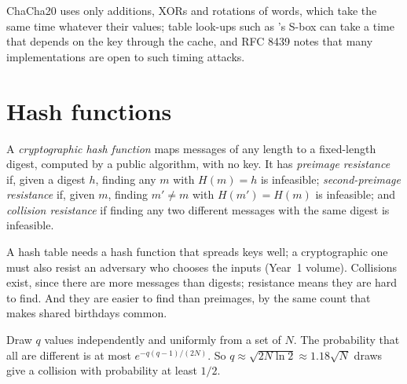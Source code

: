 \label{lst:b3:symmetric-cryptography:chacha}

\label{out:b3:symmetric-cryptography:chacha}

ChaCha20 uses only additions, XORs and rotations of words, which take the same time whatever their values; table look-ups such as 's S-box can take a time that depends on the key through the cache, and RFC 8439 notes that many  implementations are open to such timing attacks. %

\section{Hash functions}\label{sec:b3:symmetric-cryptography:hash}

\begin{definition}\label{def:b3:symmetric-cryptography:hash}
A \emph{cryptographic hash function} maps messages of any length to a fixed-length digest, computed by a public algorithm, with no key. It has \emph{preimage resistance} if, given a digest $h$, finding any $m$ with $H(m) = h$ is infeasible; \emph{second-preimage resistance} if, given $m$, finding $m' \ne m$ with $H(m') = H(m)$ is infeasible; and \emph{collision resistance} if finding any two different messages with the same digest is infeasible.
\end{definition}

A hash table needs a hash function that spreads keys well; a cryptographic one must also resist an adversary who chooses the inputs (Year~1 volume). Collisions exist, since there are more messages than digests; resistance means they are hard to find. And they are easier to find than preimages, by the same count that makes shared birthdays common.

\begin{theorem}\label{thm:b3:symmetric-cryptography:birthday}
Draw $q$ values independently and uniformly from a set of $N$. The probability that all are different is at most $e^{-q(q-1)/(2N)}$. So $q \approx \sqrt{2N \ln 2} \approx 1.18\sqrt{N}$ draws give a collision with probability at least $1/2$.
\end{theorem}

